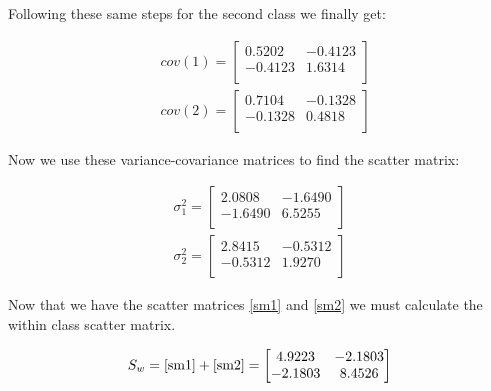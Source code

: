 \documentclass[12pt]{article}
\begin{document}
\noindent
Following these same steps for the second class we finally get:
\begin{center}
    
    \begin{align*}
        &cov(1)=\begin{bmatrix}
            0.5202& -0.4123\\
            -0.4123 & 1.6314\\
        \end{bmatrix} \\
        &cov(2) = \begin{bmatrix}
            0.7104 & -0.1328\\
            -0.1328 & 0.4818\\
        \end{bmatrix}
    \end{align*}
\end{center}

Now we use these variance-covariance matrices to find the scatter matrix:
\begin{center}
    
    \begin{align}
        \sigma_{1}^{2} = \begin{bmatrix}
            2.0808 & -1.6490\\
            -1.6490 & 6.5255\\
        \end{bmatrix} \label{sm1}\\
        \sigma_{2}^{2} = \begin{bmatrix}
            2.8415 & -0.5312\\
            -0.5312 & 1.9270\\
        \end{bmatrix} \label{sm2}
    \end{align}
\end{center}

Now that we have the scatter matrices \ref{sm1} and \ref{sm2} we must calculate the within class scatter matrix.

\begin{center}
    
    \begin{align}
        S_{w} = \ref{sm1} + \ref{sm2} = \begin{bmatrix}
            4.9223 & -2.1803\\
            -2.1803 & 8.4526\\
        \end{bmatrix} \label{wcsm}
    \end{align}
\end{center}
\end{document}
